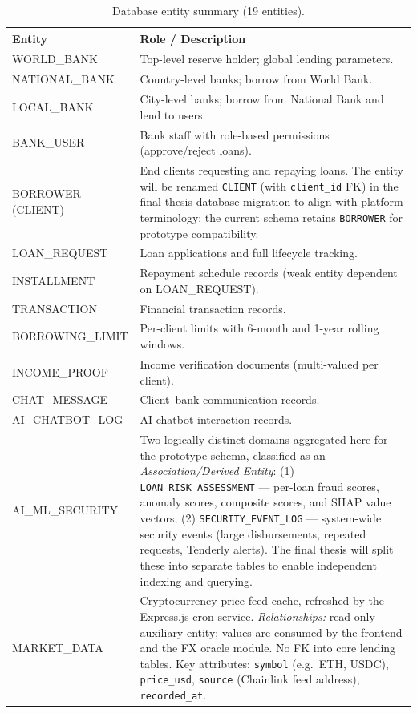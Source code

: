 \documentclass[12pt,a4paper]{report}
\begin{document}
\begin{table}[H]
\centering
\caption{Database entity summary (19 entities).}
\label{tab:db-entities}
\begin{tabular}{p{4cm}p{9.5cm}}
\hline
\textbf{Entity} & \textbf{Role / Description} \\
\hline
WORLD\_BANK & Top-level reserve holder; global lending parameters. \\
NATIONAL\_BANK & Country-level banks; borrow from World Bank. \\
LOCAL\_BANK & City-level banks; borrow from National Bank and lend to users. \\
BANK\_USER & Bank staff with role-based permissions (approve/reject loans). \\
BORROWER (CLIENT) & End clients requesting and repaying loans. The entity will be renamed \texttt{CLIENT} (with \texttt{client\_id} FK) in the final thesis database migration to align with platform terminology; the current schema retains \texttt{BORROWER} for prototype compatibility. \\
LOAN\_REQUEST & Loan applications and full lifecycle tracking. \\
INSTALLMENT & Repayment schedule records (weak entity dependent on LOAN\_REQUEST). \\
TRANSACTION & Financial transaction records. \\
BORROWING\_LIMIT & Per-client limits with 6-month and 1-year rolling windows. \\
INCOME\_PROOF & Income verification documents (multi-valued per client). \\
CHAT\_MESSAGE & Client--bank communication records. \\
AI\_CHATBOT\_LOG & AI chatbot interaction records. \\
AI\_ML\_SECURITY & Two logically distinct domains aggregated here for the prototype schema, classified as an \textit{Association/Derived Entity}: (1) \texttt{LOAN\_RISK\_ASSESSMENT} --- per-loan fraud scores, anomaly scores, composite scores, and SHAP value vectors; (2) \texttt{SECURITY\_EVENT\_LOG} --- system-wide security events (large disbursements, repeated requests, Tenderly alerts). The final thesis will split these into separate tables to enable independent indexing and querying. \\
MARKET\_DATA & Cryptocurrency price feed cache, refreshed by the Express.js cron service. \textit{Relationships:} read-only auxiliary entity; values are consumed by the frontend and the FX oracle module. No FK into core lending tables. Key attributes: \texttt{symbol} (e.g.\ ETH, USDC), \texttt{price\_usd}, \texttt{source} (Chainlink feed address), \texttt{recorded\_at}. \\

\end{tabular}
\end{table}
\end{document}

